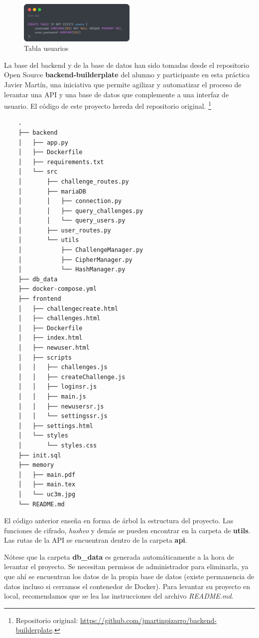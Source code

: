 \documentclass[a4paper,11pt]{article}
\begin{document}
\begin{figure}[h]
    \centering
    \includegraphics[width=0.5\textwidth]{images/users.png}
    \caption{Tabla usuarios}
    \label{fig:Tabla de desafios privados}
\end{figure}

La base del backend y de la base de datos han sido tomadas desde el repositorio Open Source \textbf{backend-builderplate} del alumno y participante en esta práctica Javier Martín, una iniciativa que permite agilizar y automatizar el proceso de levantar una API y una base de datos que complemente a una interfaz de usuario. El código de este proyecto hereda del repositorio original.%
\footnote{Repositorio original: \url{https://github.com/jmartinpizarro/backend-builderplate}.}

\begin{verbatim}
    .
    ├── backend
    │   ├── app.py
    │   ├── Dockerfile
    │   ├── requirements.txt
    │   └── src
    │       ├── challenge_routes.py
    │       ├── mariaDB
    │       │   ├── connection.py
    │       │   ├── query_challenges.py
    │       │   └── query_users.py
    │       ├── user_routes.py
    │       └── utils
    │           ├── ChallengeManager.py
    │           ├── CipherManager.py
    │           └── HashManager.py
    ├── db_data
    ├── docker-compose.yml
    ├── frontend
    │   ├── challengecreate.html
    │   ├── challenges.html
    │   ├── Dockerfile
    │   ├── index.html
    │   ├── newuser.html
    │   ├── scripts
    │   │   ├── challenges.js
    │   │   ├── createChallenge.js
    │   │   ├── loginsr.js
    │   │   ├── main.js
    │   │   ├── newusersr.js
    │   │   └── settingssr.js
    │   ├── settings.html
    │   └── styles
    │       └── styles.css
    ├── init.sql
    ├── memory
    │   ├── main.pdf
    │   ├── main.tex
    │   └── uc3m.jpg
    └── README.md
\end{verbatim}

El código anterior enseña en forma de árbol la estructura del proyecto. Las funciones de cifrado, \textit{hasheo} y demás se pueden encontrar en la carpeta de \textbf{utils}. Las rutas de la API se encuentran dentro de la carpeta \textbf{api}.

Nótese que la carpeta \textbf{db\_data} es generada automáticamente a la hora de levantar el proyecto. Se necesitan permisos de administrador para eliminarla, ya que ahí se encuentran los datos de la propia base de datos (existe permanencia de datos incluso si cerramos el contenedor de Docker). Para levantar su proyecto en local, recomendamos que se lea las instrucciones del archivo \textit{README.md}.
    
\end{document}
